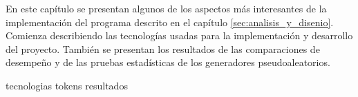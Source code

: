 %
%
%

%
%
En este capítulo se presentan algunos de los aspectos más interesantes de
la implementación del programa descrito en el capítulo
\ref{sec:analisis_y_disenio}. Comienza describiendo las tecnologías
usadas para la implementación y desarrollo del proyecto. También se presentan
los resultados de las comparaciones de desempeño y de las pruebas estadísticas
de los generadores pseudoaleatorios.

{tecnologias}
{tokens}
{resultados}
